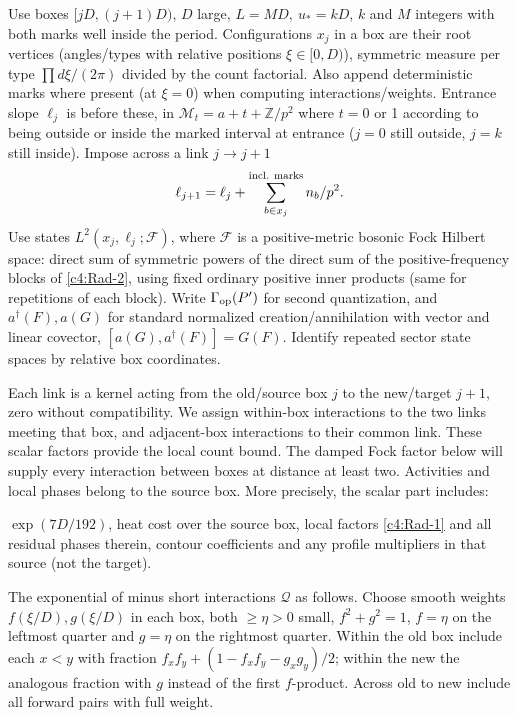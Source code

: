 Use boxes \([jD,(j+1)D)\), \(D\) large, \(L=M D,\ u_*=kD\), \(k\) and \(M\) integers with both marks well inside the period. Configurations \(x_j\) in a box are their root vertices (angles/types with relative positions \(\xi\in[0,D)\)), symmetric measure per type \(\prod d\xi/(2\pi)\) divided by the count factorial. Also append deterministic marks where present (at \(\xi=0\)) when computing interactions/weights. Entrance slope \(\ell_j\) is before these, in \(\mathcal M_t=a+t+\mathbb Z/p^2\) where \(t=0\) or 1 according to being outside or inside the marked interval at entrance (\(j=0\) still outside, \(j=k\) still inside). Impose across a link \(j\to j+1\)
\[
 \ell_{j+1}=\ell_j+\sum_{b\in x_j}^{\rm incl.\ marks} n_b/p^2 .
\]
Use states \(L^2(x_j,\ell_j;\mathscr F)\), where \(\mathscr F\) is a positive-metric bosonic Fock Hilbert space: direct sum of symmetric powers of the direct sum of the positive-frequency blocks of \eqref{c4:Rad-2}, using fixed ordinary positive inner products (same for repetitions of each block). Write \(\Gamma_{\rm op}(P')\) for second quantization, and \(a^\dagger(F),a(G)\) for standard normalized creation/annihilation with vector and linear covector, \([a(G),a^\dagger(F)]=G(F)\). Identify repeated sector state spaces by relative box coordinates.

Each link is a kernel acting from the old/source box \(j\) to the
new/target \(j+1\), zero without compatibility. We assign within-box
interactions to the two links meeting that box, and adjacent-box
interactions to their common link. These scalar factors provide the
local count bound. The damped Fock factor below will supply every
interaction between boxes at distance at least two. Activities and
local phases belong to the source box. More precisely, the scalar
part includes:
\par\noindent\textbullet\quad \(\exp(7D/192)\), heat cost over the source box, local factors \eqref{c4:Rad-1} and all residual phases therein, contour coefficients and any profile multipliers in that source (not the target).
\par\noindent\textbullet\quad The exponential of minus short interactions \(\mathcal Q\) as follows. Choose smooth weights \(f(\xi/D),g(\xi/D)\) in each box, both \(\ge\eta>0\) small, \(f^2+g^2=1\), \(f=\eta\) on the leftmost quarter and \(g=\eta\) on the rightmost quarter. Within the old box include each \(x<y\) with fraction \(f_x f_y+(1-f_x f_y-g_x g_y)/2\); within the new the analogous fraction with \(g\) instead of the first \(f\)-product. Across old to new include all forward pairs with full weight.

